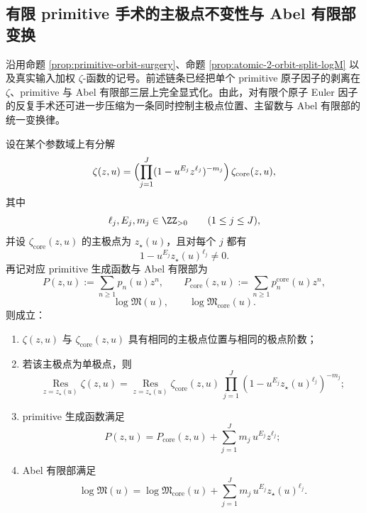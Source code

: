 \subsection{有限 primitive 手术的主极点不变性与 Abel 有限部变换}\label{subsec:conclusion-finite-primitive-surgery-pole-abel-law}
沿用命题 \ref{prop:primitive-orbit-surgery}、命题 \ref{prop:atomic-2-orbit-split-logM} 以及真实输入加权 \(\zeta\)-函数的记号。前述链条已经把单个 primitive 原子因子的剥离在 \(\zeta\)、primitive 与 Abel 有限部三层上完全显式化。由此，对有限个原子 Euler 因子的反复手术还可进一步压缩为一条同时控制主极点位置、主留数与 Abel 有限部的统一变换律。

\begin{theorem}\label{thm:conclusion-finite-primitive-surgery-pole-finitepart-transform}
设在某个参数域上有分解
\[
\zeta(z,u)=
\Bigl(\prod_{j=1}^{J}(1-u^{E_j}z^{\ell_j})^{-m_j}\Bigr)\,
\zeta_{\mathrm{core}}(z,u),
\]
其中
\[
\ell_j,E_j,m_j\in \ZZ_{>0}\qquad (1\le j\le J),
\]
并设 \(\zeta_{\mathrm{core}}(z,u)\) 的主极点为 \(z_\star(u)\)，且对每个 \(j\) 都有
\[
1-u^{E_j}z_\star(u)^{\ell_j}\neq 0.
\]
再记对应 primitive 生成函数与 Abel 有限部为
\[
P(z,u):=\sum_{n\ge 1}p_n(u)z^n,
\qquad
P_{\mathrm{core}}(z,u):=\sum_{n\ge 1}p_n^{\mathrm{core}}(u)z^n,
\]
\[
\log\mathfrak M(u),
\qquad
\log\mathfrak M_{\mathrm{core}}(u).
\]
则成立：
\begin{enumerate}
  \item \(\zeta(z,u)\) 与 \(\zeta_{\mathrm{core}}(z,u)\) 具有相同的主极点位置与相同的极点阶数；
  \item 若该主极点为单极点，则
  \[
  \operatorname*{Res}_{z=z_\star(u)}\zeta(z,u)
  =
  \operatorname*{Res}_{z=z_\star(u)}\zeta_{\mathrm{core}}(z,u)\,
  \prod_{j=1}^{J}(1-u^{E_j}z_\star(u)^{\ell_j})^{-m_j};
  \]
  \item primitive 生成函数满足
  \[
  P(z,u)=P_{\mathrm{core}}(z,u)+\sum_{j=1}^{J}m_j\,u^{E_j}z^{\ell_j};
  \]
  \item Abel 有限部满足
  \[
  \log\mathfrak M(u)
  =
  \log\mathfrak M_{\mathrm{core}}(u)
  +
  \sum_{j=1}^{J}m_j\,u^{E_j}z_\star(u)^{\ell_j}.
  \]
\end{enumerate}
\end{theorem}
